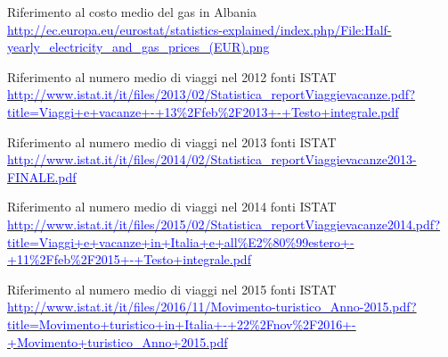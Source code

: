 \begin{thebibliography}{99}
 Riferimento al costo medio del gas in Albania\newline 
			\href{http://ec.europa.eu/eurostat/statistics-explained/index.php/File:Half-yearly\_electricity\_and\_gas\_prices\_(EUR).png}{\textcolor{blue}{http://ec.europa.eu/eurostat/statistics-explained/index.php/File:Half-yearly\_electricity\_and\_gas\_prices\_(EUR).png}}

 Riferimento al numero medio di viaggi nel 2012 fonti ISTAT\newline 
			\href{http://www.istat.it/it/files/2013/02/Statistica\_reportViaggievacanze.pdf?title=Viaggi+e+vacanze+-+13\%2Ffeb\%2F2013+-+Testo+integrale.pdf}{\textcolor{blue}{http://www.istat.it/it/files/2013/02/Statistica\_reportViaggievacanze.pdf?title=Viaggi+e+vacanze+-+13\%2Ffeb\%2F2013+-+Testo+integrale.pdf}}

 Riferimento al numero medio di viaggi nel 2013 fonti ISTAT\newline 
			\href{http://www.istat.it/it/files/2014/02/Statistica\_reportViaggievacanze2013-FINALE.pdf}{\textcolor{blue}{http://www.istat.it/it/files/2014/02/Statistica\_reportViaggievacanze2013-FINALE.pdf}}

 Riferimento al numero medio di viaggi nel 2014 fonti ISTAT\newline 
			\href{http://www.istat.it/it/files/2015/02/Statistica\_reportViaggievacanze2014.pdf?title=Viaggi+e+vacanze+in+Italia+e+all\%E2\%80\%99estero+-+11\%2Ffeb\%2F2015+-+Testo+integrale.pdf}{\textcolor{blue}{http://www.istat.it/it/files/2015/02/Statistica\_reportViaggievacanze2014.pdf?title=Viaggi+e+vacanze+in+Italia+e+all\%E2\%80\%99estero+-+11\%2Ffeb\%2F2015+-+Testo+integrale.pdf}}
			
 Riferimento al numero medio di viaggi nel 2015 fonti ISTAT\newline 
			\href{http://www.istat.it/it/files/2016/11/Movimento-turistico\_Anno-2015.pdf?title=Movimento+turistico+in+Italia+-+22\%2Fnov\%2F2016+-+Movimento+turistico\_Anno+2015.pdf}{\textcolor{blue}{http://www.istat.it/it/files/2016/11/Movimento-turistico\_Anno-2015.pdf?title=Movimento+turistico+in+Italia+-+22\%2Fnov\%2F2016+-+Movimento+turistico\_Anno+2015.pdf}}
			

		
\end{thebibliography}